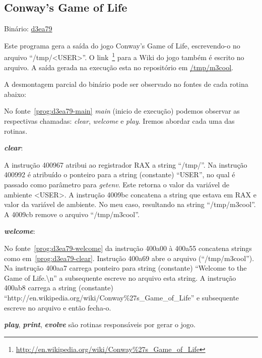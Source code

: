 \subsection{Conway's Game of Life}
Binário: \href{https://s3.amazonaws.com/chaordic-desafio-cloud/d3ea79}{d3ea79}

Este programa gera a saída do jogo Conway's Game of Life,
escrevendo-o no arquivo ``/tmp/<USER>''. O
link~\footnote{\href{http://en.wikipedia.org/wiki/Conway\%27s\_Game\_of\_Life}{http://en.wikipedia.org/wiki/Conway\%27s\_Game\_of\_Life}}
para a Wiki do jogo também é escrito no arquivo. A saída gerada na
execução esta no repositório em
\href{https://github.com/alessandro11/desafio-1/blob/master/m3cool}{/tmp/m3cool}.

A desmontagem parcial do binário pode ser observado no
fontes de cada rotina abaixo:



No fonte~\ref{prog:d3ea79-main} \emph{main} (inicio de execução)
podemos observar as respectivas chamadas: \emph{clear}, \emph{welcome}
e \emph{play}. Iremos abordar cada uma das rotinas.\\

\par\textbf{\emph{clear}}:


A instrução 400967 atribui ao registrador RAX
a string ``/tmp/''. Na instrução 400992 é atribuído o ponteiro para a
string (constante) ``USER'', no qual é passado como parâmetro para
\emph{getenv}. Este retorna o valor da variável de ambiente <USER>.
A instrução 4009bc concatena a string que estava em RAX e valor da
variável de ambiente. No meu caso, resultando na string
``/tmp/m3cool''. A 4009cb remove o arquivo ``/tmp/m3cool''.\\

\par\textbf{\emph{welcome}}:


No fonte~\ref{prog:d3ea79-welcome} da instrução 400a00 à 400a55
concatena strings como em~\ref{prog:d3ea79-clear}. Instrução 400a69
abre o arquivo (``/tmp/m3cool''). Na instrução 400aa7 carrega ponteiro
para string (constante) ``Welcome to the Game of Life.\textbackslash n'' a
subsequente escreve no arquivo esta string. A instrução 400ab8 carrega a
string (constante) ``http://en.wikipedia.org/wiki/Conway\%27s\_Game\_of\_Life'' e
subsequente escreve no arquivo e então fecha-o.\\

\par\textbf{\emph{play}}, \textbf{\emph{print}},
\textbf{\emph{evolve}} são rotinas responsáveis por gerar o jogo.

